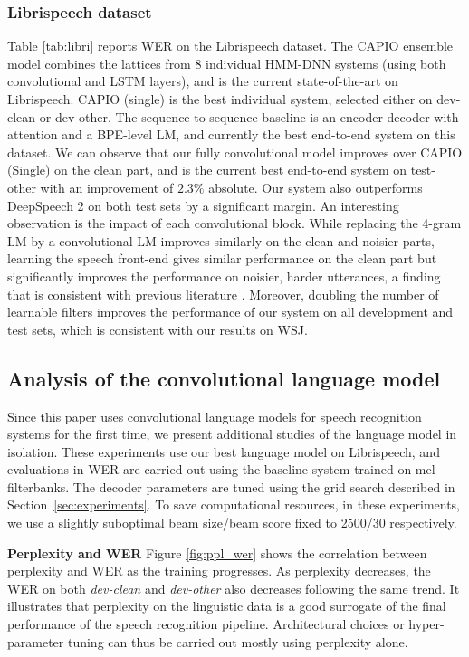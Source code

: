 \documentclass[a4paper]{article}
\begin{document}
\subsubsection{Librispeech dataset}
Table \ref{tab:libri} reports WER on the Librispeech dataset. The CAPIO \cite{capio} ensemble model combines the lattices from 8 individual HMM-DNN systems (using both convolutional and LSTM layers), and is the current state-of-the-art on Librispeech. CAPIO (single) is the best individual system, selected either on dev-clean or dev-other. The sequence-to-sequence baseline is an encoder-decoder with attention and a BPE-level \cite{bpe} LM, and currently the best end-to-end system on this dataset. We can observe that our fully convolutional model improves over CAPIO (Single) on the clean part, and is the current best end-to-end system on test-other with an improvement of $2.3\%$ absolute. Our system also outperforms DeepSpeech 2 on both test sets by a significant margin. An interesting observation is the impact of each convolutional block. While replacing the 4-gram LM by a convolutional LM improves similarly on the clean and noisier parts, learning the speech front-end gives similar performance on the clean part but significantly improves the performance on noisier, harder utterances, a finding that is consistent with previous literature \cite{hoshen2015speech}. Moreover, doubling the number of learnable filters improves the performance of our system on all development and test sets, which is consistent with our results on WSJ. 

\subsection{Analysis of the convolutional language model}
Since this paper uses convolutional language models for speech recognition systems for the first time, we present additional studies of the language model in isolation. These experiments use our best language model on Librispeech, and evaluations in WER are carried out using the baseline system trained on mel-filterbanks.  The decoder parameters are tuned using the grid search described in Section~\ref{sec:experiments}. To save computational resources, in these experiments, we use a slightly suboptimal beam size/beam score fixed to 2500/30 respectively. 


{\bf Perplexity and WER}
Figure \ref{fig:ppl_wer} shows the correlation between perplexity and WER as the training progresses. 
As perplexity decreases, the WER on both \emph{dev-clean} and 
\emph{dev-other} also decreases following the same trend. 
It illustrates that perplexity on the linguistic data is a good surrogate of the final performance of the speech recognition pipeline. Architectural choices or hyper-parameter tuning can thus be carried out mostly using perplexity alone.
\end{document}

